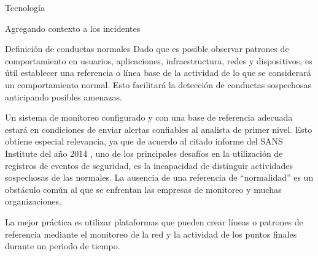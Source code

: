 \begin{section}{Tecnología}
\begin{subsection}{Agregando contexto a los incidentes}
        \end{subsection}
        \begin{subsection}{Definición de conductas normales}
        Dado que es posible observar patrones de comportamiento en usuarios, aplicaciones, infraestructura, redes y dispositivos, es útil establecer una referencia o línea base de la actividad de lo que se considerará un comportamiento normal. Esto facilitará la detección de conductas sospechosas anticipando posibles amenazas. \par
        Un sistema de monitoreo configurado y con una base de referencia adecuada estará en condiciones de enviar alertas confiables al analista de primer nivel. Esto obtiene especial relevancia, ya que de acuerdo al citado informe del SANS Institute del año 2014 \cite{sans_1}, uno de los principales desafíos en la utilización de registros de eventos de seguridad, es la incapacidad de distinguir actividades sospechosas de las normales. La ausencia de una referencia de “normalidad” es un obstáculo común al que se enfrentan las empresas de monitoreo y muchas organizaciones. \par
        La mejor práctica es utilizar plataformas que pueden crear líneas o patrones de referencia mediante el monitoreo de la red y la actividad de los puntos finales durante un periodo de tiempo.
        \end{subsection}
        

\end{section}
